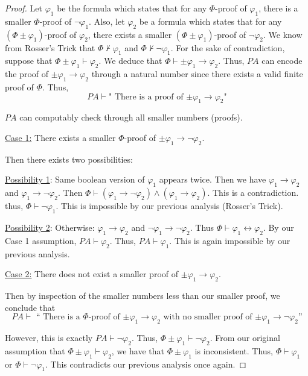 \documentclass[a4paper,10pt]{article}
\let\phi\varphi
\newcommand*\map{\rightarrow}
\newcommand*\n{\newline\par}
\newcommand*\prf{\vdash}
\newcommand*\biject{\leftrightarrow}
\begin{document}
  \begin{proof}
    Let $\phi_1$ be the formula which states that for any $\Phi$-proof of $\phi_1$, there is a smaller $\Phi$-proof of $\neg\phi_1$. Also, let $\phi_2$ be a formula which states that for any $(\Phi\pm\phi_1)$-proof of $\phi_2$, there exists a 
    smaller $(\Phi\pm\phi_1)$-proof of $\neg\phi_2$. We know from Rosser's Trick that $\Phi \not\prf \phi_1$ and $\Phi \not\prf \neg\phi_1$. For the sake of contradiction, suppose that 
    $\Phi\pm\phi_1\prf\phi_2$. We deduce that $\Phi\prf\pm\phi_1\map\phi_2$. Thus, $PA$ can encode the proof of $\pm\phi_1\map\phi_2$ through a natural number since there exists a valid finite proof of $\Phi$. Thus,
    \begin{equation*}
      PA \prf \text{" There is a proof of $\pm\phi_1\map\phi_2$"}
    \end{equation*}

    $PA$ can computably check through all smaller numbers (proofs). \n
    
    \underline{Case 1:} There exists a smaller $\Phi$-proof of $\pm\phi_1\map\neg\phi_2$. \n
    
    Then there exists two possibilities: \n 
    
    \underline{Possibility 1}: Same boolean version of $\phi_1$ appears twice.
    Then we have $\phi_1\map\phi_2$ and $\phi_1\map\neg\phi_2$. Then $\Phi \prf (\phi_1\map\neg\phi_2) \land (\phi_1\map\phi_2)$. This is a contradiction. thus, $\Phi \prf \neg\phi_1$. This is impossible by our previous analysis (Rosser's Trick). \n
    
    \underline{Possibility 2}: Otherwise: $\phi_1\map\phi_2$ and $\neg\phi_1\map\neg\phi_2$. Thus $\Phi \prf \phi_1 \biject \phi_2$. By our Case 1 assumption, $PA \prf \phi_2$. Thus, $PA \prf \phi_1$. This is again impossible by our previous analysis. \n
    
    \underline{Case 2:} There does not exist a smaller proof of $\pm\phi_1\map\phi_2$.
    
    Then by inspection of the smaller numbers less than our smaller proof, we conclude that 
    \begin{equation*}
     PA \prf \text{ `` There is a $\Phi$-proof of $\pm\phi_1 \map \phi_2$ with no smaller proof of $\pm\phi_1 \map \neg\phi_2$''}
    \end{equation*}

    However, this is exactly $PA \prf \neg\phi_2$. Thus, $\Phi \pm \phi_1 \prf \neg\phi_2$. From our original assumption that $\Phi\pm\phi_1\prf\phi_2$, we have that $\Phi \pm \phi_1$ is inconsistent. Thus, $\Phi \prf \phi_1$ or $\Phi \prf \neg\phi_1$.
    This contradicts our previous analysis once again.
  \end{proof}
\end{document}
